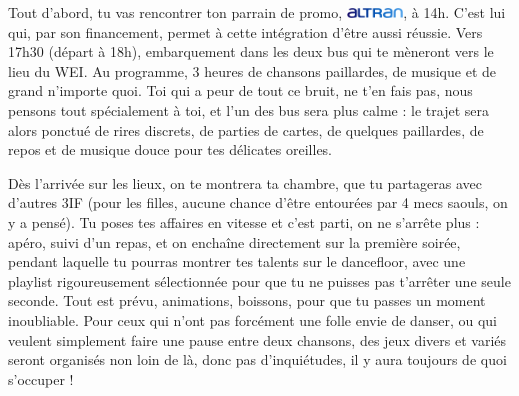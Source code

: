 Tout d'abord, tu vas rencontrer ton parrain de promo,
     \includegraphics[height=7.5pt]{images/logoAltran.jpg}, à 14h.
C'est lui qui,
par son financement, permet à cette intégration d'être aussi réussie.
Vers 17h30 (départ à 18h), embarquement dans les deux bus qui te mèneront vers le lieu du
WEI. Au programme, 3 heures de chansons paillardes, de musique et de grand
n'importe quoi.
Toi qui a peur de tout ce bruit, ne t'en fais pas, nous pensons tout
spécialement à toi, et l'un des bus sera plus calme : le trajet sera alors ponctué de
rires discrets, de parties de cartes, de quelques paillardes, de repos et de
musique douce pour tes délicates oreilles.

Dès l'arrivée sur les lieux, on te montrera ta chambre, que tu partageras avec
d'autres 3IF (pour les filles, aucune chance d'être entourées par 4 mecs saouls,
on y a pensé). Tu poses tes affaires en vitesse et c'est parti, on ne s'arrête
plus : apéro, suivi d'un repas, et on enchaîne directement sur la première
soirée, pendant laquelle tu pourras montrer tes talents sur le dancefloor, avec
une playlist rigoureusement sélectionnée pour que tu ne puisses pas t'arrêter une
seule seconde. Tout est prévu, animations, boissons, pour que tu passes un
moment inoubliable. Pour ceux qui n'ont pas forcément une folle envie de danser, ou
qui veulent simplement faire une pause entre deux chansons, des jeux divers et variés seront
organisés non loin de là, donc pas d'inquiétudes, il y aura toujours de quoi s'occuper !
  

